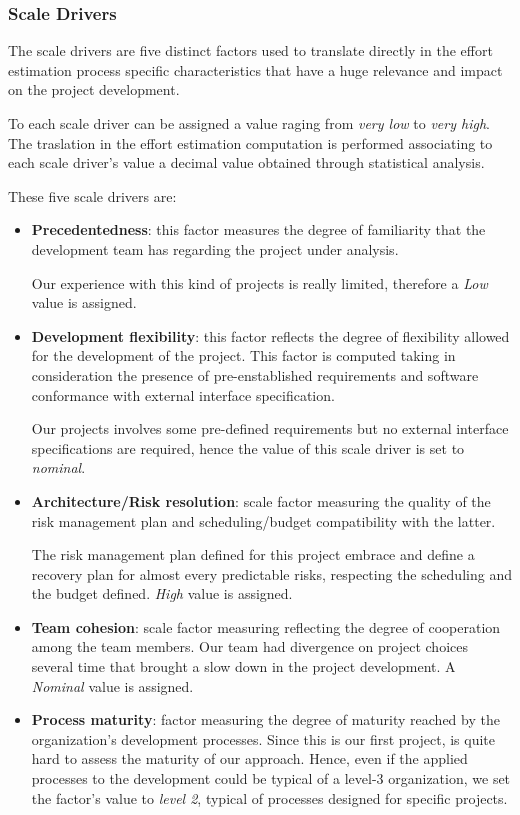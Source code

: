 \subsubsection{Scale Drivers}

The scale drivers are five distinct factors used to translate directly in the effort estimation process specific characteristics that have a huge relevance and impact on the project development.

To each scale driver can be assigned a value raging from \textit{very low} to \textit{very high}. The traslation in the effort estimation computation is performed associating to each scale driver's value a decimal value obtained through statistical analysis.

These five scale drivers are:

\begin{itemize}
	\item \textbf{Precedentedness}: this factor measures the degree of familiarity that the development team has regarding the project under analysis.

Our experience with this kind of projects is really limited, therefore a \textit{Low} value is assigned.
	\item \textbf{Development flexibility}: this factor reflects the degree of flexibility allowed for the development of the project. This factor is computed taking in consideration the presence of pre-enstablished requirements and software conformance with external interface specification.

Our projects involves some pre-defined requirements but no external interface specifications are required, hence the value of this scale driver is set to \textit{nominal}.
	\item \textbf{Architecture/Risk resolution}: scale factor measuring the quality of the risk management plan and scheduling/budget compatibility with the latter.

The risk management plan defined for this project embrace and define a recovery plan for almost every predictable risks, respecting the scheduling and the budget defined. \textit{High} value is assigned.
	\item \textbf{Team cohesion}: scale factor measuring reflecting the degree of cooperation among the team members.
Our team had divergence on project choices several time that brought a slow down in the project development. A \textit{Nominal} value is assigned.

	\item \textbf{Process maturity}: factor measuring the degree of maturity reached by the organization's development processes.
Since this is our first project, is quite hard to assess the maturity of our approach. Hence, even if the applied processes to the development could be typical of a level-3 organization, we set the factor's value to \textit{level 2}, typical of processes designed for specific projects. 
\end{itemize}

